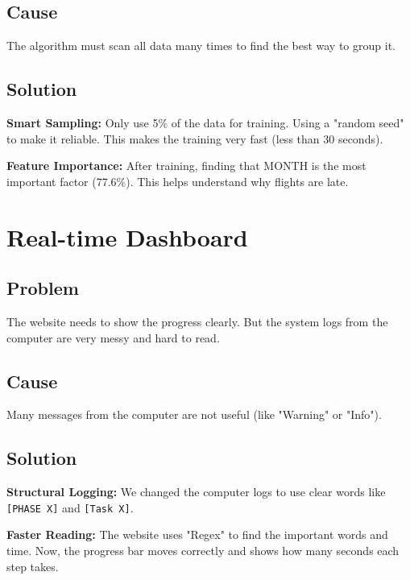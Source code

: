 \documentclass[12pt,a4paper]{report}
\begin{document}
\subsection{Cause}

The algorithm must scan all data many times to find the best way to group it.

\subsection{Solution}

\noindent\textbf{Smart Sampling:} Only use 5\% of the data for training. Using a "random seed" to make it reliable. This makes the training very fast (less than 30 seconds).

\noindent\textbf{Feature Importance:} After training, finding that MONTH is the most important factor (77.6\%). This helps understand why flights are late.

\section{Real-time Dashboard}

\subsection{Problem}

The website needs to show the progress clearly. But the system logs from the computer are very messy and hard to read.

\subsection{Cause}

Many messages from the computer are not useful (like "Warning" or "Info").

\subsection{Solution}

\noindent\textbf{Structural Logging:} We changed the computer logs to use clear words like \texttt{[PHASE X]} and \texttt{[Task X]}.

\noindent\textbf{Faster Reading:} The website uses "Regex" to find the important words and time. Now, the progress bar moves correctly and shows how many seconds each step takes.
\end{document}
